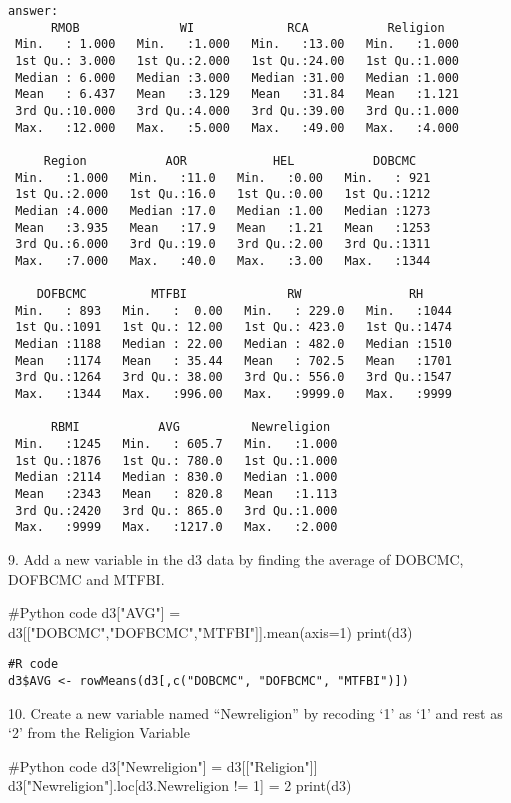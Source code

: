 \documentclass{article}
\begin{document}
\begin{verbatim}
answer: 
      RMOB              WI             RCA           Religion
 Min.   : 1.000   Min.   :1.000   Min.   :13.00   Min.   :1.000  
 1st Qu.: 3.000   1st Qu.:2.000   1st Qu.:24.00   1st Qu.:1.000  
 Median : 6.000   Median :3.000   Median :31.00   Median :1.000  
 Mean   : 6.437   Mean   :3.129   Mean   :31.84   Mean   :1.121  
 3rd Qu.:10.000   3rd Qu.:4.000   3rd Qu.:39.00   3rd Qu.:1.000  
 Max.   :12.000   Max.   :5.000   Max.   :49.00   Max.   :4.000
 
     Region           AOR            HEL           DOBCMC
 Min.   :1.000   Min.   :11.0   Min.   :0.00   Min.   : 921
 1st Qu.:2.000   1st Qu.:16.0   1st Qu.:0.00   1st Qu.:1212
 Median :4.000   Median :17.0   Median :1.00   Median :1273
 Mean   :3.935   Mean   :17.9   Mean   :1.21   Mean   :1253
 3rd Qu.:6.000   3rd Qu.:19.0   3rd Qu.:2.00   3rd Qu.:1311
 Max.   :7.000   Max.   :40.0   Max.   :3.00   Max.   :1344
 
    DOFBCMC         MTFBI              RW               RH
 Min.   : 893   Min.   :  0.00   Min.   : 229.0   Min.   :1044
 1st Qu.:1091   1st Qu.: 12.00   1st Qu.: 423.0   1st Qu.:1474
 Median :1188   Median : 22.00   Median : 482.0   Median :1510
 Mean   :1174   Mean   : 35.44   Mean   : 702.5   Mean   :1701
 3rd Qu.:1264   3rd Qu.: 38.00   3rd Qu.: 556.0   3rd Qu.:1547
 Max.   :1344   Max.   :996.00   Max.   :9999.0   Max.   :9999
 
      RBMI           AVG          Newreligion
 Min.   :1245   Min.   : 605.7   Min.   :1.000
 1st Qu.:1876   1st Qu.: 780.0   1st Qu.:1.000
 Median :2114   Median : 830.0   Median :1.000
 Mean   :2343   Mean   : 820.8   Mean   :1.113
 3rd Qu.:2420   3rd Qu.: 865.0   3rd Qu.:1.000
 Max.   :9999   Max.   :1217.0   Max.   :2.000  

\end{verbatim}


9. Add a new variable in the d3 data by finding the average of DOBCMC, DOFBCMC and MTFBI.
\begin{pythoncode}
#Python code
d3["AVG"] = d3[["DOBCMC","DOFBCMC","MTFBI"]].mean(axis=1)
print(d3)
\end{pythoncode}

\begin{verbatim}
#R code
d3$AVG <- rowMeans(d3[,c("DOBCMC", "DOFBCMC", "MTFBI")])

\end{verbatim}


10. Create a new variable named “Newreligion” by recoding ‘1’ as ‘1’ and rest as ‘2’ from the Religion Variable
\begin{pythoncode}
#Python code
d3["Newreligion"] = d3[["Religion"]]
d3["Newreligion"].loc[d3.Newreligion != 1] = 2
print(d3)
\end{pythoncode}
\end{document}
